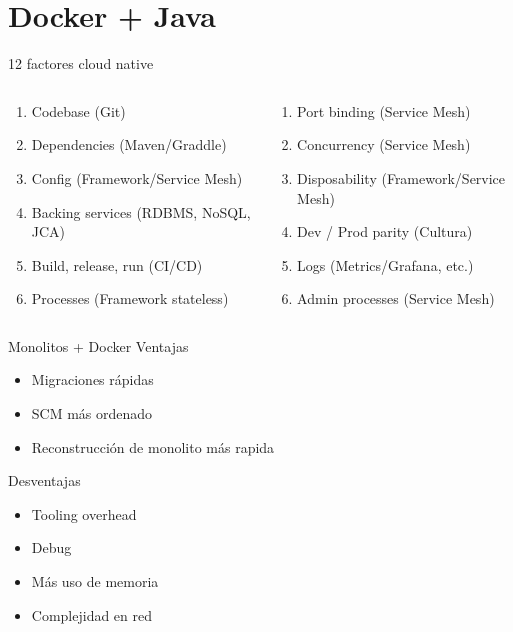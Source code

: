 \documentclass{beamer}
\begin{document}
\section{Docker + Java}

\begin{frame}{12 factores cloud native}
\begin{columns}
	\begin{column}{0.5\textwidth}
		\begin{enumerate}
			\item Codebase \pause (Git)
			\item Dependencies \pause (Maven/Graddle)
			\item Config \pause (Framework/Service Mesh)
			\item Backing services \pause (RDBMS, NoSQL, JCA)
			\item Build, release, run \pause (CI/CD)
			\item Processes \pause (Framework stateless)
		\end{enumerate}
	\end{column}
	\begin{column}{0.5\textwidth}  %
		\begin{enumerate}
			\item Port binding \pause  (Service Mesh)
			\item Concurrency \pause (Service Mesh)
			\item Disposability \pause (Framework/Service Mesh)
			\item Dev / Prod parity \pause (Cultura)
			\item Logs \pause (Metrics/Grafana, etc.)
			\item Admin processes \pause (Service Mesh)
		\end{enumerate}
	\end{column}
\end{columns}
\end{frame}

\begin{frame}{Monolitos + Docker}
Ventajas
\begin{itemize}
	\item Migraciones rápidas
	\item SCM más ordenado
	\item Reconstrucción de monolito más rapida
\end{itemize}
Desventajas
\begin{itemize}
	\item Tooling overhead
	\item Debug
	\item Más uso de memoria
	\item Complejidad en red
\end{itemize}
\end{frame}
\end{document}
